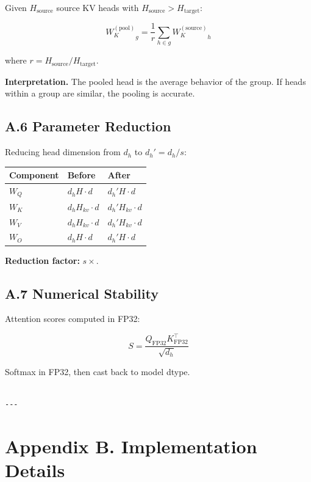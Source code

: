 Given $H_\text{source}$ source KV heads with $H_\text{source} > H_\text{target}$:

\[
{W_K^{(\text{pool})}}_g = \frac{1}{r} \sum_{h \in g} {W_K^{(\text{source})}}_h
\]

where $r = H_\text{source} / H_\text{target}$.

\textbf{Interpretation.} The pooled head is the average behavior of the group. 
If heads within a group are similar, the pooling is accurate.

\subsection{A.6 Parameter Reduction}

Reducing head dimension from $d_h$ to $d_h' = d_h / s$:

\begin{table}[H]
\centering
\small
\begin{tabular}{lll}
\toprule
\textbf{Component} & \textbf{Before} & \textbf{After} \\
\midrule
$W_Q$ & $d_h H \cdot d$ & $d_h' H \cdot d$ \\
$W_K$ & $d_h H_{kv} \cdot d$ & $d_h' H_{kv} \cdot d$ \\
$W_V$ & $d_h H_{kv} \cdot d$ & $d_h' H_{kv} \cdot d$ \\
$W_O$ & $d_h H \cdot d$ & $d_h' H \cdot d$ \\
\bottomrule
\end{tabular}
\end{table}

\textbf{Reduction factor:} $s\times$.

\subsection{A.7 Numerical Stability}

Attention scores computed in FP32:

\[
S = \frac{Q_\text{FP32} K_\text{FP32}^\top}{\sqrt{d_h}}
\]

Softmax in FP32, then cast back to model dtype.
\begin{lstlisting}

---
\end{lstlisting}


\section{Appendix B. Implementation Details}

